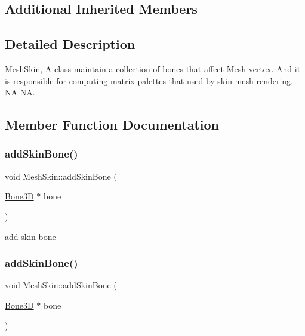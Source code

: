 \subsection*{Additional Inherited Members}


\subsection{Detailed Description}
\hyperlink{classMeshSkin}{Mesh\+Skin}, A class maintain a collection of bones that affect \hyperlink{classMesh}{Mesh} vertex. And it is responsible for computing matrix palettes that used by skin mesh rendering.  NA  NA. 

\subsection{Member Function Documentation}
\mbox{\label{classMeshSkin_a64945183efaca64d7b7fdd9c74262ed1}} 
\subsubsection{\texorpdfstring{add\+Skin\+Bone()}{addSkinBone()}\hspace{0.1cm}{\footnotesize\ttfamily [1/2]}}
{\footnotesize\ttfamily void Mesh\+Skin\+::add\+Skin\+Bone (\begin{DoxyParamCaption}\item[{\hyperlink{classBone3D}{Bone3D} $\ast$}]{bone }\end{DoxyParamCaption})}

add skin bone \mbox{\label{classMeshSkin_a64945183efaca64d7b7fdd9c74262ed1}} 
\subsubsection{\texorpdfstring{add\+Skin\+Bone()}{addSkinBone()}\hspace{0.1cm}{\footnotesize\ttfamily [2/2]}}
{\footnotesize\ttfamily void Mesh\+Skin\+::add\+Skin\+Bone (\begin{DoxyParamCaption}\item[{\hyperlink{classBone3D}{Bone3D} $\ast$}]{bone }\end{DoxyParamCaption})}

